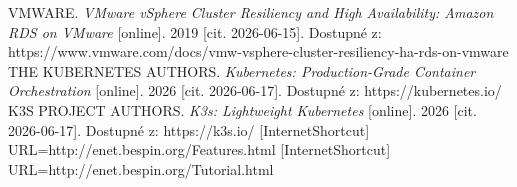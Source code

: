\documentclass{article}
\begin{document}
\begin{thebibliography}[20]
    VMWARE. \textit{VMware vSphere Cluster Resiliency and High Availability: Amazon RDS on VMware} [online]. 2019 [cit. 2026-06-15]. Dostupné z: https://www.vmware.com/docs/vmw-vsphere-cluster-resiliency-ha-rds-on-vmware
THE KUBERNETES AUTHORS. \textit{Kubernetes: Production-Grade Container Orchestration} [online]. 2026 [cit. 2026-06-17]. Dostupné z: https://kubernetes.io/
K3S PROJECT AUTHORS. \textit{K3s: Lightweight Kubernetes} [online]. 2026 [cit. 2026-06-17]. Dostupné z: https://k3s.io/
[InternetShortcut]
URL=http://enet.bespin.org/Features.html
[InternetShortcut]
URL=http://enet.bespin.org/Tutorial.html

\end{thebibliography}
\end{document}
